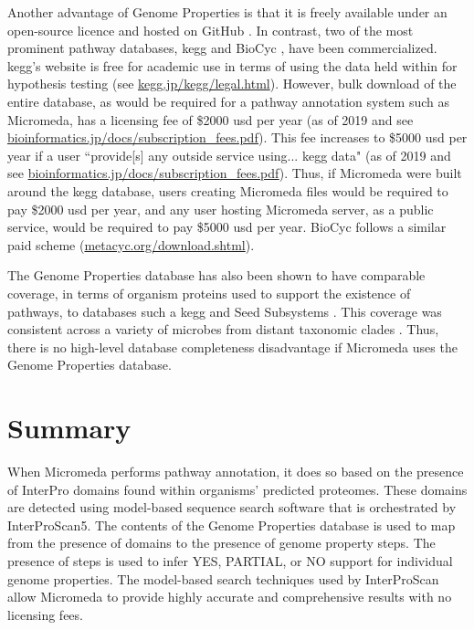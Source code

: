 Another advantage of Genome Properties is that it is freely available under an 
open-source licence and hosted on GitHub \cite{richardson2018genome}. In 
contrast, two of the most prominent pathway databases, \gls{kegg} and BioCyc 
\cite{karp2005expansion}, have been commercialized. \gls{kegg}'s website is free 
for academic use in terms of using the data held within for hypothesis testing 
(see \href{http://www.kegg.jp/kegg/legal.html}{kegg.jp/kegg/legal.html}). 
However, bulk download of the entire database, as would be required for a 
pathway annotation system such as Micromeda, has a licensing fee of \$2000 
\gls{usd} per year (as of 2019 and see 
\href{https://www.bioinformatics.jp/docs/subscription_fees.pdf}{bioinformatics.jp/docs/subscription\_fees.pdf}). 
This fee increases to \$5000 \gls{usd} per year if a user ``provide[s] any 
outside service using... \gls{kegg} data" (as of 2019 and see 
\href{https://www.bioinformatics.jp/docs/subscription_fees.pdf}{bioinformatics.jp/docs/subscription\_fees.pdf}). 
Thus, if Micromeda were built around the \gls{kegg} database, users creating 
Micromeda files would be required to pay \$2000 \gls{usd} per year, and any user 
hosting Micromeda server, as a public service, would be required to pay \$5000 
\gls{usd} per year. BioCyc follows a similar paid scheme 
(\href{http://metacyc.org/download.shtml}{metacyc.org/download.shtml}). 

The Genome Properties database has also been shown to have comparable coverage, 
in terms of organism proteins used to support the existence of pathways, to 
databases such a \gls{kegg} and Seed Subsystems \cite{richardson2018genome}. 
This coverage was consistent across a variety of microbes from distant taxonomic 
clades \cite{richardson2018genome}. Thus, there is no high-level database 
completeness disadvantage if Micromeda uses the Genome Properties database. 

\section{Summary} \label{introduction_summary}

When Micromeda performs pathway annotation, it does so based on the presence of 
InterPro domains found within organisms' predicted proteomes. These domains are 
detected using model-based sequence search software that is orchestrated by 
InterProScan5. The contents of the Genome Properties database is used to map 
from the presence of domains to the presence of genome property steps. The 
presence of steps is used to infer YES, PARTIAL, or NO support for individual 
genome properties. The model-based search techniques used by InterProScan allow 
Micromeda to provide highly accurate and comprehensive results with no licensing 
fees.

